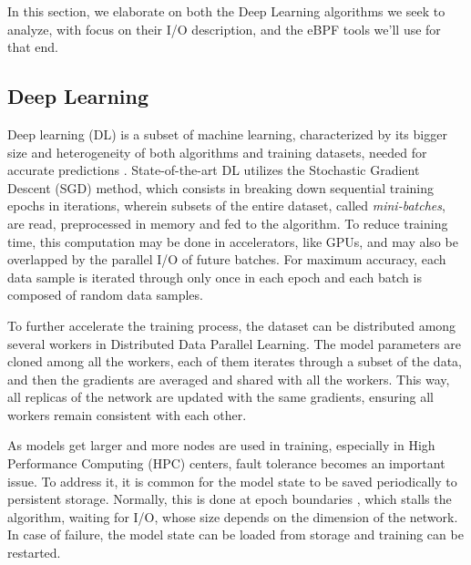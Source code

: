 \documentclass[conference]{IEEEtran}
\begin{document}

    In this section, we elaborate on both the Deep Learning algorithms we seek to analyze, with focus on their I/O description, and the eBPF tools we'll use for that end.

    \subsection{Deep Learning}

    Deep learning (DL) is a subset of machine learning, characterized by its bigger size and heterogeneity of both algorithms and training datasets, needed for accurate predictions \cite{gradient}. State-of-the-art DL utilizes the Stochastic Gradient Descent (SGD) method, which consists in breaking down sequential training epochs in iterations, wherein subsets of the entire dataset, called \textit{mini-batches}, are read, preprocessed in memory and fed to the algorithm. To reduce training time, this computation may be done in accelerators, like GPUs, and may also be overlapped by the parallel I/O of future batches. For maximum accuracy, each data sample is iterated through only once in each epoch and each batch is composed of random data samples.

    To further accelerate the training process, the dataset can be distributed among several workers in Distributed Data Parallel Learning. The model parameters are cloned among all the workers, each of them iterates through a subset of the data, and then the gradients are averaged and shared with all the workers. This way, all replicas of the network are updated with the same gradients, ensuring all workers remain consistent with each other.

    As models get larger and more nodes are used in training, especially in High Performance Computing (HPC) centers, fault tolerance becomes an important issue. To address it, it is common for the model state to be saved periodically to persistent storage. Normally, this is done at epoch boundaries \cite{checkfreq}, which stalls the algorithm, waiting for I/O, whose size depends on the dimension of the network. In case of failure, the model state can be loaded from storage and training can be restarted.
\end{document}
